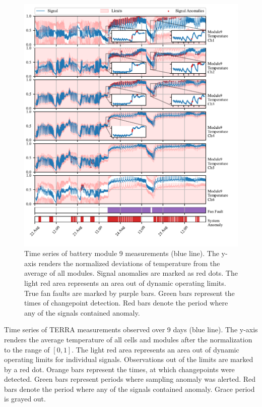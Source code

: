 \begin{figure}[htbp]
 \centerline{\includegraphics{figures/Kokam_thresh_first_zoom.pdf}}
 \caption{Time series of battery module 9 measurements (blue line). The y-axis renders the normalized deviations of temperature from the average of all modules. Signal anomalies are marked as red dots. The light red area represents an area out of dynamic operating limits. True fan faults are marked by purple bars. Green bars represent the times of changepoint detection. Red bars denote the period where any of the signals contained anomaly.}
 \label{fig:kokam_first}
\end{figure}

Time series of TERRA measurements observed over 9 days (blue line). The y-axis renders the average temperature of all cells and modules after the normalization to the range of $[0, 1]$. The light red area represents an area out of dynamic operating limits for individual signals. Observations out of the limits are marked by a red dot. Orange bars represent the times, at which changepoints were detected. Green bars represent periods where sampling anomaly was alerted. Red bars denote the period where any of the signals contained anomaly. Grace period is grayed out.

